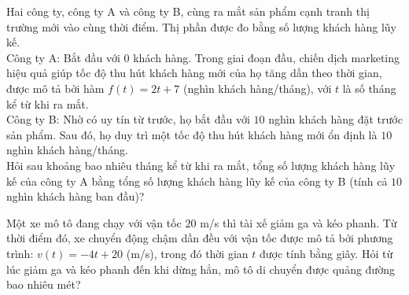 \begin{bt}%
	Hai công ty, công ty A và công ty B, cùng ra mắt sản phẩm cạnh tranh thị trường mới vào cùng thời điểm. Thị phần  được đo bằng số lượng khách hàng lũy kế.\\
	Công ty A: Bắt  đầu với $0$ khách hàng. Trong giai đoạn đầu, chiến dịch marketing hiệu quả giúp tốc độ thu hút khách hàng mới của họ tăng dần theo thời gian, được mô tả bởi hàm $f(t) = 2t + 7$ (nghìn khách hàng/tháng), với $t$ là số tháng kể từ khi ra mắt. \\
	Công ty B: Nhờ có uy tín từ trước, họ bắt đầu với $10$ nghìn khách hàng đặt trước sản phẩm. Sau đó, họ duy trì một tốc độ thu hút khách hàng mới ổn định  là $10$ nghìn khách hàng/tháng.\\
	Hỏi sau khoảng bao nhiêu tháng kể từ khi ra mắt, tổng số lượng khách hàng lũy kế  của công ty A bằng tổng số lượng khách hàng lũy kế của công ty B (tính cả $10$ nghìn khách hàng ban đầu)?
\end{bt}

\begin{bt}%
	 Một xe mô tô đang chạy với vận tốc $20$ m/s thì tài xế giảm ga và kéo phanh. Từ thời điểm đó, xe chuyển động chậm dần đều với vận tốc được mô tả bởi phương trình: $v(t)=-4t+20$ (m/s), trong đó thời gian $t$ được tính bằng giây. Hỏi từ lúc giảm ga và kéo phanh đến khi dừng hẳn, mô tô di chuyển được quảng đường bao nhiêu mét?
\end{bt}

